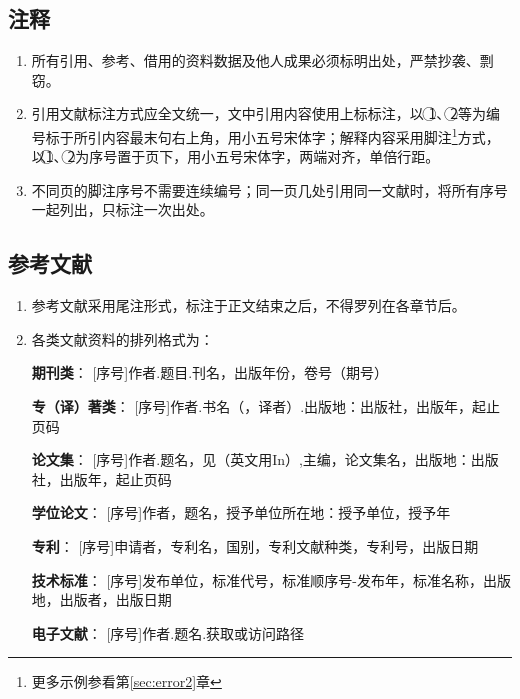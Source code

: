 \subsection{注释}

\begin{enumerate}[label=\arabic*)]
	\item 所有引用、参考、借用的资料数据及他人成果必须标明出处，严禁抄袭、剽窃。
	
	\item 引用文献标注方式应全文统一，文中引用内容使用上标标注，以 \textcircled{1}、\textcircled{2}等为编号标于所引内容最末句右上角，用小五号宋体字；解释内容采用脚注\footnote{更多示例参看第\ref{sec:error2}章}方式，以\textcircled{1}、\textcircled{2}为序号置于页下，用小五号宋体字，两端对齐，单倍行距。
	
	\item 不同页的脚注序号不需要连续编号；同一页几处引用同一文献时，将所有序号一起列出，只标注一次出处。
	
\end{enumerate}

\subsection{参考文献}

\begin{enumerate}[label=\arabic*)]
	\item 参考文献采用尾注形式，标注于正文结束之后，不得罗列在各章节后。
	
	\item 各类文献资料的排列格式为：
	
	{\bfseries 期刊类}：
	[序号]作者.题目.刊名，出版年份，卷号（期号）
	
	{\bfseries 专（译）著类}：
	[序号]作者.书名（，译者）.出版地：出版社，出版年，起止页码
	
	{\bfseries 论文集}：
	[序号]作者.题名，见（英文用In）,主编，论文集名，出版地：出版社，出版年，起止页码
	
	{\bfseries 学位论文}：
	[序号]作者，题名，授予单位所在地：授予单位，授予年
	
	{\bfseries 专利}：
	[序号]申请者，专利名，国别，专利文献种类，专利号，出版日期
	
	{\bfseries 技术标准}：
	[序号]发布单位，标准代号，标准顺序号-发布年，标准名称，出版地，出版者，出版日期
	
	{\bfseries 电子文献}：
	[序号]作者.题名.获取或访问路径
	
\end{enumerate}

